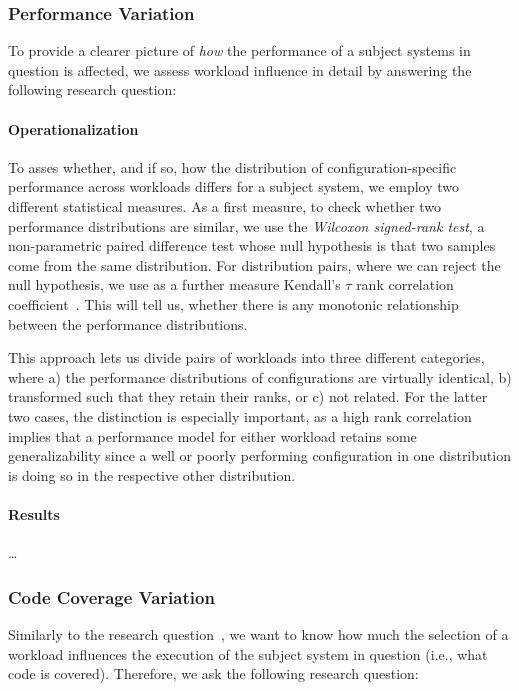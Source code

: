 \subsubsection{Performance Variation}\label{sec:performance_variation}
To provide a clearer picture of \textit{how} the performance of a subject systems in question is affected, we assess workload influence in detail by answering the following research question:

{\color{blue}
\paragraph{Operationalization} To asses whether, and if so, how the distribution of configuration-specific performance across workloads differs for a subject system, we employ two different statistical measures. As a first measure, to check whether two performance distributions are similar, we use the \textit{Wilcoxon signed-rank test}, a non-parametric paired difference test whose null hypothesis is that two samples come from the same distribution. For distribution pairs, where we can reject the null hypothesis, we use as a further measure Kendall's $\tau$ rank correlation coefficient~\cite{kendall1938new}. This will tell us, whether there is any monotonic relationship between the performance distributions. 

This approach lets us divide pairs of workloads into three different categories, where a) the performance distributions of configurations are virtually identical, b) transformed such that they retain their ranks, or c) not related. For the latter two cases, the distinction is especially important, as a high rank correlation implies that a performance model for either workload retains some generalizability since a well or poorly performing configuration in one distribution is doing so in the respective other distribution.

\paragraph{Results} \ldots
}
\subsubsection{Code Coverage Variation}\label{sec:coverage_spectra}

Similarly to the research question~, we want to know how much the selection of a workload influences the execution of the subject system in question (i.e., what code is covered). Therefore, we ask the following research question:

